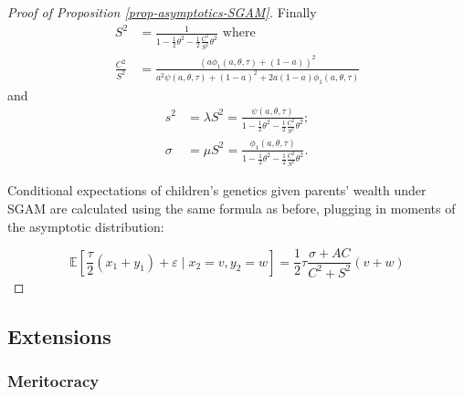 \documentclass[
  12pt,
]{article}
\theoremstyle{definition}
\theoremstyle{definition}
\theoremstyle{definition}
\theoremstyle{definition}
\theoremstyle{remark}
\begin{document}
\begin{proof}[Proof of Proposition \ref{prop-asymptotics-SGAM}]
Finally
\begin{align*}
S^{2} & =\frac{1}{1-\frac{1}{2}\theta^{2}-\frac{1}{2}\frac{C^{2}}{S^{2}}\theta^{2}}\text{ where}\\
\frac{C^{2}}{S^{2}} & =\frac{\left(a\phi_{1}\left(a,\theta,\tau\right)+\left(1-a\right)\right)^{2}}{a^{2}\psi\left(a,\theta,\tau\right)+\left(1-a\right)^{2}+2a\left(1-a\right)\phi_{1}\left(a,\theta,\tau\right)}
\end{align*}
and
\begin{align*}
s^{2} & =\lambda S^{2}=\frac{\psi\left(a,\theta,\tau\right)}{1-\frac{1}{2}\theta^{2}-\frac{1}{2}\frac{C^{2}}{S^{2}}\theta^{2}};\\
\sigma & =\mu S^{2}=\frac{\phi_{1}\left(a,\theta,\tau\right)}{1-\frac{1}{2}\theta^{2}-\frac{1}{2}\frac{C^{2}}{S^{2}}\theta^{2}}.
\end{align*}

Conditional expectations of children's genetics given parents' wealth under SGAM
are calculated using the same formula as before, plugging in moments of the 
asymptotic distribution:

\[
\mathbb{E}\left[ \frac{\tau }{2}\left( x_{1}+y_{1}\right) +\varepsilon \mid
x_{2}=v,y_{2}=w\right]  = \frac{1}{2}\tau \frac{\sigma+AC%
}{C^{2}+S^{2}}\left( v+w\right)  
\]

\end{proof}

\subsection{Extensions}\label{extensions-1}

\subsubsection{Meritocracy}\label{meritocracy}
\end{document}
